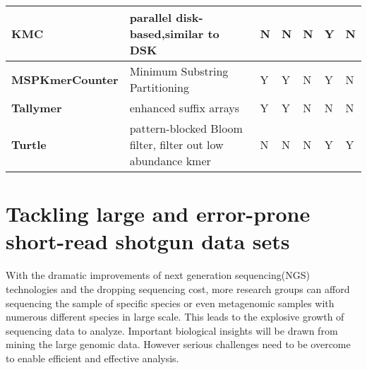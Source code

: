 \begin{landscape}
{\begin{tabular}{|l|l|l|l|l|l|l|}
\textbf{KMC}            & parallel disk-based,similar to DSK                          & N                                                                                             & N                                                                                             & N             & Y                       & N                         \\ \hline
\textbf{MSPKmerCounter} & Minimum Substring Partitioning                              & Y                                                                                             & Y                                                                                             & N             & Y                       & N                         \\ \hline
\textbf{Tallymer}       & enhanced suffix arrays                                      & Y                                                                                             & Y                                                                                             & N             & N                       & N                         \\ \hline
\textbf{Turtle}         & pattern-blocked Bloom filter, filter out low abundance kmer & N                                                                                             & N                                                                                             & N             & Y                       & Y                         \\ \hline
\end{tabular}
}
\label{table:kmer_counting}
 
\end{landscape}



\section{Tackling large and error-prone short-read shotgun data sets}

With the dramatic improvements of next generation sequencing(NGS) technologies
and the dropping sequencing cost, more research groups can afford 
sequencing the sample of specific species or even
metagenomic samples with numerous different species in large scale\cite{pubmed19997069}. 
This leads to the explosive growth of sequencing data to analyze. 
Important biological insights will be drawn from mining the large genomic data.
However serious challenges need to be overcome to enable efficient and effective
analysis. 

